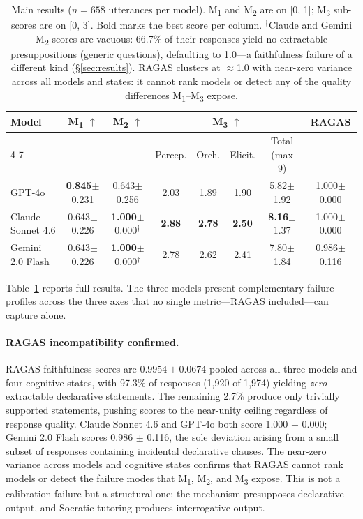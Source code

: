 \documentclass[11pt]{article}
\newcommand{\mtwo}{M\textsubscript{2}\xspace}
\newcommand{\mone}{M\textsubscript{1}\xspace}
\newcommand{\mthree}{M\textsubscript{3}\xspace}
\begin{document}
\begin{table}[t]
\centering
\small
\begin{tabular}{lccccccc}
\toprule
\multirow{2}{*}{\textbf{Model}}
  & \multirow{2}{*}{\textbf{\mone} $\uparrow$}
  & \multirow{2}{*}{\textbf{\mtwo} $\uparrow$}
  & \multicolumn{4}{c}{\textbf{\mthree} $\uparrow$}
  & \multirow{2}{*}{\textbf{RAGAS}} \\
\cmidrule(lr){4-7}
  & & & Percep. & Orch. & Elicit. & Total (max 9) & \\
\midrule
GPT-4o
  & \textbf{0.845}\scriptsize{$\pm$0.231}
  & 0.643\scriptsize{$\pm$0.256}
  & 2.03 & 1.89 & 1.90
  & 5.82\scriptsize{$\pm$1.92}
  & 1.000\scriptsize{$\pm$0.000} \\
Claude Sonnet 4.6
  & 0.643\scriptsize{$\pm$0.226}
  & \textbf{1.000}\scriptsize{$\pm$0.000}$^\dagger$
  & \textbf{2.88} & \textbf{2.78} & \textbf{2.50}
  & \textbf{8.16}\scriptsize{$\pm$1.37}
  & 1.000\scriptsize{$\pm$0.000} \\
Gemini 2.0 Flash
  & 0.643\scriptsize{$\pm$0.226}
  & \textbf{1.000}\scriptsize{$\pm$0.000}$^\dagger$
  & 2.78 & 2.62 & 2.41
  & 7.80\scriptsize{$\pm$1.84}
  & 0.986\scriptsize{$\pm$0.116} \\
\bottomrule
\end{tabular}
\caption{Main results ($n = 658$ utterances per model). \mone and \mtwo are
on [0, 1]; \mthree sub-scores are on [0, 3]. Bold marks the best score per
column. $^\dagger$Claude and Gemini \mtwo scores are vacuous: 66.7\% of
their responses yield no extractable presuppositions (generic questions),
defaulting to 1.0---a faithfulness failure of a different kind
(\S\ref{sec:results}). RAGAS clusters at $\approx$1.0 with near-zero
variance across all models and states: it cannot rank models or detect any
of the quality differences \mone--\mthree expose.}
\label{tab:results}
\end{table}

Table~\ref{tab:results} reports full results.
The three models present complementary failure profiles across the three axes
that no single metric---RAGAS included---can capture alone.

\paragraph{RAGAS incompatibility confirmed.}
RAGAS faithfulness scores are $0.9954 \pm 0.0674$ pooled across all three
models and four cognitive states, with 97.3\% of responses (1{,}920 of
1{,}974) yielding \emph{zero} extractable declarative statements.
The remaining 2.7\% produce only trivially supported statements, pushing
scores to the near-unity ceiling regardless of response quality.
Claude Sonnet 4.6 and GPT-4o both score 1.000 $\pm$ 0.000; Gemini 2.0 Flash
scores 0.986 $\pm$ 0.116, the sole deviation arising from a small subset of
responses containing incidental declarative clauses.
The near-zero variance across models and cognitive states confirms that RAGAS
cannot rank models or detect the failure modes that \mone, \mtwo, and \mthree
expose.
This is not a calibration failure but a structural one: the mechanism
presupposes declarative output, and Socratic tutoring produces interrogative
output.
\end{document}
